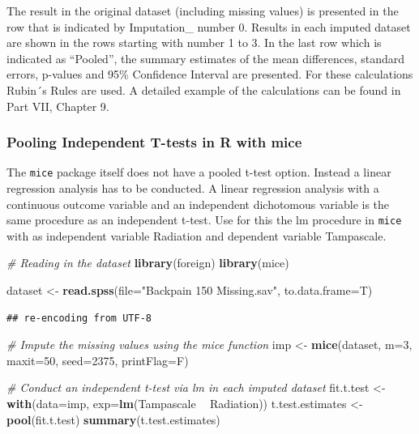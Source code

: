 \documentclass[
]{book}
\newenvironment{Shaded}{\begin{snugshade}}{\end{snugshade}}
\newcommand{\CommentTok}[1]{\textcolor[rgb]{0.56,0.35,0.01}{\textit{#1}}}
\newcommand{\DataTypeTok}[1]{\textcolor[rgb]{0.13,0.29,0.53}{#1}}
\newcommand{\DecValTok}[1]{\textcolor[rgb]{0.00,0.00,0.81}{#1}}
\newcommand{\KeywordTok}[1]{\textcolor[rgb]{0.13,0.29,0.53}{\textbf{#1}}}
\newcommand{\NormalTok}[1]{#1}
\newcommand{\OperatorTok}[1]{\textcolor[rgb]{0.81,0.36,0.00}{\textbf{#1}}}
\newcommand{\StringTok}[1]{\textcolor[rgb]{0.31,0.60,0.02}{#1}}
\begin{document}
The result in the original dataset (including missing values) is
presented in the row that is indicated by Imputation\_ number 0. Results
in each imputed dataset are shown in the rows starting with number 1 to
3. In the last row which is indicated as ``Pooled'', the summary
estimates of the mean differences, standard errors, p-values and 95\%
Confidence Interval are presented. For these calculations Rubin´s Rules
are used. A detailed example of the calculations can be found in Part
VII, Chapter 9.

\hypertarget{pooling-independent-t-tests-in-r-with-mice}{%
\subsubsection{Pooling Independent T-tests in R with
mice}\label{pooling-independent-t-tests-in-r-with-mice}}

The \texttt{mice} package itself does not have a pooled t-test option.
Instead a linear regression analysis has to be conducted. A linear
regression analysis with a continuous outcome variable and an
independent dichotomous variable is the same procedure as an independent
t-test. Use for this the lm procedure in \texttt{mice} with as
independent variable Radiation and dependent variable Tampascale.

\begin{Shaded}
\begin{Highlighting}[]
\CommentTok{# Reading in the dataset}
\KeywordTok{library}\NormalTok{(foreign)}
\KeywordTok{library}\NormalTok{(mice)}

\NormalTok{dataset <-}\StringTok{ }\KeywordTok{read.spss}\NormalTok{(}\DataTypeTok{file=}\StringTok{"Backpain 150 Missing.sav"}\NormalTok{, }\DataTypeTok{to.data.frame=}\NormalTok{T)}
\end{Highlighting}
\end{Shaded}

\begin{verbatim}
## re-encoding from UTF-8
\end{verbatim}

\begin{Shaded}
\begin{Highlighting}[]
\CommentTok{# Impute the missing values using the mice function }
\NormalTok{imp <-}\StringTok{ }\KeywordTok{mice}\NormalTok{(dataset, }\DataTypeTok{m=}\DecValTok{3}\NormalTok{, }\DataTypeTok{maxit=}\DecValTok{50}\NormalTok{, }\DataTypeTok{seed=}\DecValTok{2375}\NormalTok{, }\DataTypeTok{printFlag=}\NormalTok{F)}
 
\CommentTok{# Conduct an independent t-test via lm in each imputed dataset}
\NormalTok{fit.t.test <-}\StringTok{ }\KeywordTok{with}\NormalTok{(}\DataTypeTok{data=}\NormalTok{imp, }\DataTypeTok{exp=}\KeywordTok{lm}\NormalTok{(Tampascale }\OperatorTok{~}\StringTok{ }\NormalTok{Radiation))}
\NormalTok{t.test.estimates <-}\StringTok{ }\KeywordTok{pool}\NormalTok{(fit.t.test)}
\KeywordTok{summary}\NormalTok{(t.test.estimates)}
\end{Highlighting}
\end{Shaded}
\end{document}

